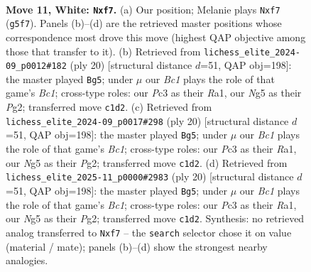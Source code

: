 \documentclass[11pt]{article}
\begin{document}
\begin{figure}[p]\centering
\begin{subfigure}{0.46\textwidth}\centering
\resizebox{\linewidth}{!}{%
\newchessgame
\chessboard[
  setfen={r2q1rk1/1bp2ppp/pbnp1n2/1p2p1N1/3PP3/1BP5/PP3PPP/RNBQR1K1 w - - 3 11},
  showmover=false,
  pgfstyle=straightmove, color=movearrow, markmove={g5-f7}
]}
\caption{}
\end{subfigure}\hfill
\begin{subfigure}{0.46\textwidth}\centering
\resizebox{\linewidth}{!}{%
\newchessgame
\chessboard[
  setfen={r2q1rk1/1bp2ppp/pbnp1n2/1p2p3/P2PP3/1BP2N2/1P3PPP/RNBQR1K1 w - - 3 11},
  showmover=false,
  pgfstyle=straightmove, color=movearrow, markmove={c1-g5}
]}
\caption{}
\end{subfigure}
\\[4pt]
\begin{subfigure}{0.46\textwidth}\centering
\resizebox{\linewidth}{!}{%
\newchessgame
\chessboard[
  setfen={r2q1rk1/1bp2ppp/pbnp1n2/1p2p3/P2PP3/1BP2N2/1P3PPP/RNBQR1K1 w - - 1 11},
  showmover=false,
  pgfstyle=straightmove, color=movearrow, markmove={c1-g5}
]}
\caption{}
\end{subfigure}\hfill
\begin{subfigure}{0.46\textwidth}\centering
\resizebox{\linewidth}{!}{%
\newchessgame
\chessboard[
  setfen={r2q1rk1/1bp2ppp/pbnp1n2/1p2p3/P2PP3/1BP2N2/1P3PPP/RNBQR1K1 w - - 3 11},
  showmover=false,
  pgfstyle=straightmove, color=movearrow, markmove={c1-g5}
]}
\caption{}
\end{subfigure}
\caption{\textbf{Move 11, White: \texttt{Nxf7}.} (a) Our position; Melanie plays \texttt{Nxf7} (\texttt{g5f7}). Panels (b)--(d) are the retrieved master positions whose correspondence most drove this move (highest QAP objective among those that transfer to it). (b) Retrieved from \texttt{lichess\_elite\_2024-09\_p0012\#182} (ply 20) [structural distance $d$=51, QAP obj=198]: the master played \texttt{Bg5}; under $\mu$ our \emph{Bc1} plays the role of that game's \emph{Bc1}; cross-type roles: our \emph{P}c3 as their \emph{R}a1, our \emph{N}g5 as their \emph{P}g2; transferred move \texttt{c1d2}. (c) Retrieved from \texttt{lichess\_elite\_2024-09\_p0017\#298} (ply 20) [structural distance $d$=51, QAP obj=198]: the master played \texttt{Bg5}; under $\mu$ our \emph{Bc1} plays the role of that game's \emph{Bc1}; cross-type roles: our \emph{P}c3 as their \emph{R}a1, our \emph{N}g5 as their \emph{P}g2; transferred move \texttt{c1d2}. (d) Retrieved from \texttt{lichess\_elite\_2025-11\_p0000\#2983} (ply 20) [structural distance $d$=51, QAP obj=198]: the master played \texttt{Bg5}; under $\mu$ our \emph{Bc1} plays the role of that game's \emph{Bc1}; cross-type roles: our \emph{P}c3 as their \emph{R}a1, our \emph{N}g5 as their \emph{P}g2; transferred move \texttt{c1d2}. Synthesis: no retrieved analog transferred to \texttt{Nxf7} -- the \texttt{search} selector chose it on value (material / mate); panels (b)--(d) show the strongest nearby analogies.}
\label{fig:thought-m20}
\end{figure}
\end{document}
